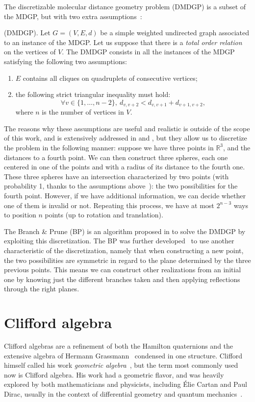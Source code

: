 \documentclass{proc}
\begin{document}
The discretizable molecular distance geometry problem (DMDGP) is a subset of the MDGP, but with two extra assumptions~\cite{dmdgp}:
\begin{definition}
(DMDGP). Let $G = (V, E, d)$ be a simple weighted undirected graph associated to an instance of the MDGP. Let us suppose that there is a \textit{total order relation} on the vertices of $V$. The DMDGP consists in all the instances of the MDGP satisfying the following two assumptions:
\begin{enumerate}
\item $E$ contains all cliques on quadruplets of consecutive vertices;
\item the following strict triangular inequality must hold:
\[ \forall v \in \{ 1, \dots, n-2 \},  \ d_{v,v+2} < d_{v,v+1} + d_{v+1,v+2}, \]
where $n$ is the number of vertices in $V$.
\end{enumerate}
\end{definition}

The reasons why these assumptions are useful and realistic is outside of the scope of this work, and is extensively addressed in \cite{dmdgp} and \cite{survey}, but they allow us to discretize the problem in the following manner: suppose we have three points in $\mathbb{R}^3$, and the distances to a fourth point.
We can then construct three spheres, each one centered in one of the points and with a radius of its distance to the fourth one. These three spheres have an intersection characterized by two points (with probability 1, thanks to the assumptions above~\cite{survey}): the two possibilities for the fourth point.
However, if we have additional information, we can decide whether one of them is invalid or not.
Repeating this process, we have at most $2^{n-3}$ ways to position $n$ points (up to rotation and translation).


The Branch \& Prune (BP) is an algorithm proposed in \cite{itor2008} to solve the DMDGP by exploiting this discretization.
The BP was further developed~\cite{symmbp} to use another characteristic of the discretization, namely that when constructing a new point, the two possibilities are symmetric in regard to the plane determined by the three previous points. This means we can construct other realizations from an initial one by knowing just the different branches taken and then applying reflections through the right planes.


\section{Clifford algebra}
Clifford algebras are a refinement of both the Hamilton quaternions and the extensive algebra of Hermann Grassmann~\cite{grassmann} condensed in one structure.
Clifford himself called his work \textit{geometric algebra}~\cite{clifford}, but the term most commonly used now is Clifford algebra. His work had a geometric flavor, and was heavily explored by both mathematicians and physicists, including \'Elie Cartan and Paul Dirac, usually in the context of differential geometry and quantum mechanics~\cite{Dorst2007}.
\end{document}
